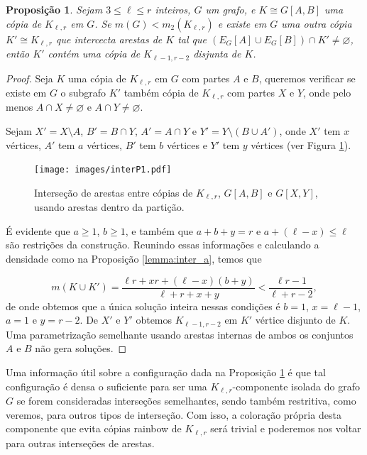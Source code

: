 \documentclass[12pt,a4paper]{book}
\newcommand{\K}{K_{\ell,r}} %
\newtheorem{proposicao} [teorema] {Proposição}
\begin{document}
    \begin{proposicao}\label{aff:casoP1}
       Sejam $3\leq \ell \leq r$ inteiros, 
      $G$ um grafo, e $K \cong G[A, B]$ uma cópia de $\K$ em $G$.
      Se $m(G) < m_2(\K)$ e existe em $G$ uma outra cópia
        $K' \cong \K $ que intercecta arestas de $K$ tal que 
        $(E_G[A] \cup E_G[B]) \cap K' \neq \varnothing$, 
        então $K'$ contém uma cópia de $K_{\ell-1,r-2}$ disjunta de $K$.
    \end{proposicao}
     \begin{proof}
         Seja $K$ uma cópia de $\K$ em $G$ com partes $A$ e $B$, queremos verificar se existe em $G$ o subgrafo $K'$ também cópia de $\K$ com partes $X$ e $Y$, onde pelo menos $A \cap X \neq \varnothing$ e $A \cap Y \neq \varnothing$.
         
         Sejam $X' = X\setminus A$,  $B' = B\cap Y$, $A' = A \cap Y$ e $Y' = Y \setminus (B\cup A')$, 
         onde
         $X'$ tem $x$ vértices, $A'$ tem $a$ vértices, $B'$ tem $b$ vértices e $Y'$ tem $y$ vértices (ver Figura \ref{fig:interP1}).


  \begin{figure}[htb] \centering \texttt{[image: images/interP1.pdf]}
   \caption{Interseção de arestas entre cópias de $\K$, $G[A,B]$ e $G[X,Y]$, usando arestas dentro da partição.}
   \label{fig:interP1}
 \end{figure}
         
         É evidente que $a \geq 1$, $b \geq 1$, e também que $a + b+y = r$ e $a + (\ell-x) \leq \ell$ são restrições da construção. 
         Reunindo essas informações e calculando a densidade como na Proposição \ref{lemma:inter_a}, temos que 
         
         \[
            m(K \cup K') = \frac{\ell r + xr + (\ell-x)(b+y)}{\ell+r+x+y}
            < \frac{\ell r - 1}{\ell+r-2},
         \]
         de onde obtemos que a única solução inteira nessas condições é $b=1$, $x = \ell-1$, $a=1$ e $y=r-2$. 
         De $X'$ e $Y'$ obtemos $K_{\ell-1, r-2}$ em $K'$ vértice disjunto de $K$.
         Uma parametrização semelhante usando arestas internas de ambos os conjuntos $A$ e $B$ não gera soluções.       
     \end{proof}
     
     Uma informação útil sobre a configuração dada na Proposição \ref{aff:casoP1} 
     é que tal configuração é densa o suficiente para ser uma $\K$-componente isolada do grafo $G$ se forem consideradas interseções semelhantes, sendo também restritiva, como veremos, para outros tipos de interseção. 
     Com isso, a coloração própria desta componente que evita cópias rainbow de $\K$ será trivial e poderemos nos voltar para outras interseções de arestas.
     
\end{document}
